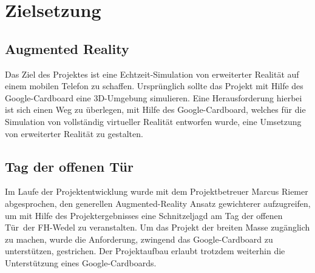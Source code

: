 \chapter{Zielsetzung}
\section{Augmented Reality}
Das Ziel des Projektes ist eine Echtzeit-Simulation von erweiterter Realität auf einem mobilen Telefon zu schaffen. Ursprünglich sollte das Projekt mit Hilfe des Google-Cardboard eine 3D-Umgebung simulieren. Eine Herausforderung hierbei ist sich einen Weg zu überlegen, mit Hilfe des Google-Cardboard, welches für die Simulation von vollständig virtueller Realität entworfen wurde, eine Umsetzung von erweiterter Realität zu gestalten.

\section{Tag der offenen Tür}
Im Laufe der Projektentwicklung wurde mit dem Projektbetreuer Marcus Riemer abgesprochen, den generellen Augmented-Reality Ansatz gewichterer aufzugreifen, um mit Hilfe des Projektergebnisses eine Schnitzeljagd am \glqq Tag der offenen Tür\grqq\ der FH-Wedel zu veranstalten. Um das Projekt der breiten Masse zugänglich zu machen, wurde die Anforderung, zwingend das Google-Cardboard zu unterstützen, gestrichen. Der Projektaufbau erlaubt trotzdem weiterhin die Unterstützung eines Google-Cardboards.
